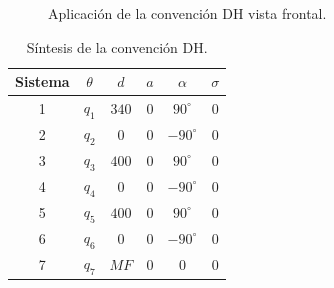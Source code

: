 \documentclass[a4paper,12pt]{article}
\begin{document}
\begin{figure}[H]
    \centering
    \begin{adjustbox}{scale = 0.9, max width=\columnwidth}
    \end{adjustbox}
    \caption{Aplicación de la convención DH vista frontal.}
    \label{DH KUKA}
\end{figure}

\begin{table}[H]
    \centering
    \begin{tabular}{|c|c|c|c|c|c|}
    \hline
    Sistema & $\theta$          & $d$    & $a$   & $\alpha$    & $\sigma$ \\ \hline
    1       & $q_1$             & $340$  & $0$   & $90^\circ$  & 0        \\ \hline
    2       & $q_2$             & $0$    & $0$   & $-90^\circ$ & 0        \\ \hline
    3       & $q_3$             & $400$  & $0$   & $90^\circ$  & 0        \\ \hline
    4       & $q_4$             & $0$    & $0$   & $-90^\circ$ & 0        \\ \hline
    5       & $q_5$             & $400$  & $0$   & $90^\circ$  & 0        \\ \hline
    6       & $q_6$             & $0$    & $0$   & $-90^\circ$ & 0        \\ \hline
    7       & $q_7$             & $MF$   & $0$   & $0$         & 0        \\ \hline
    \end{tabular}
    \caption{Síntesis de la convención DH.}
    \label{sintesis DH KUKA}
\end{table}
\end{document}
